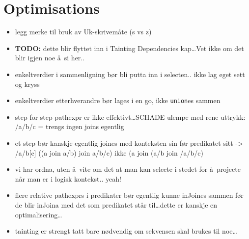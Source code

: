 \section{Optimisations}
\label{sect:disc:optimisations}
\begin{itemize}
  \item legg merke til bruk av Uk-skrivem\aa te (s vs z)
  \item \textbf{\Large TODO:} dette blir flyttet inn i Tainting Dependencies kap\ldots Vet ikke om det blir igjen
  noe \aa~si her..
  \item enkeltverdier i sammenligning b\o r bli putta inn i selecten.. ikke lag
  eget sett og kryss
  \item enkeltverdier etterhverandre b\o r lages i en go, ikke \texttt{union}es
  sammen
  \item step for step pathexpr er ikke effektivt\ldots SCHADE ulempe med rene uttrykk: /a/b/c = trengs ingen
  joins egentlig
  \item et step b\o r kanskje egentlig joines med konteksten sin f\o r predikatet sitt -> /a/b[c] ((a join a/b)
  join a/b/c) ikke (a join (a/b join /a/b/c)
  \item vi har ordna, uten \aa~vite om det at man kan selecte i stedet for \aa~projecte n\aa r man er i logisk
  kontekst.. yeah!
  \item flere relative pathexprs i predikater b\o r egentlig kunne inJoines sammen f\o r de blir inJoina
	med det som predikatet st\aa r til\ldots dette er kanskje en optimalisering\ldots
  \item tainting er strengt tatt bare n\o dvendig om sekvensen skal brukes til noe\ldots 
\end{itemize}